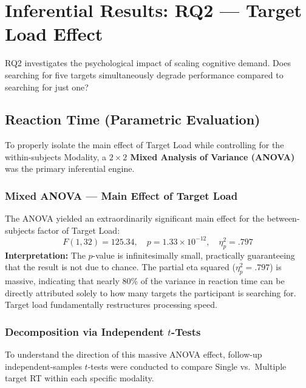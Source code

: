 \documentclass[11pt,a4paper]{article}
\begin{document}
\section{Inferential Results: RQ2 --- Target Load Effect}
\label{sec:rq2}

RQ2 investigates the psychological impact of scaling cognitive demand. Does searching for five targets simultaneously degrade performance compared to searching for just one?

\subsection{Reaction Time (Parametric Evaluation)}

To properly isolate the main effect of Target Load while controlling for the within-subjects Modality, a \textbf{$2 \times 2$ Mixed Analysis of Variance (ANOVA)} was the primary inferential engine.

\subsubsection{Mixed ANOVA --- Main Effect of Target Load}
The ANOVA yielded an extraordinarily significant main effect for the between-subjects factor of Target Load:
\[
F(1, 32) = 125.34, \quad p = 1.33 \times 10^{-12}, \quad \eta_p^2 = .797
\]
\textbf{Interpretation:} The $p$-value is infinitesimally small, practically guaranteeing that the result is not due to chance. The partial eta squared ($\eta_p^2 = .797$) is massive, indicating that nearly 80\% of the variance in reaction time can be directly attributed solely to how many targets the participant is searching for. Target load fundamentally restructures processing speed.

\subsubsection{Decomposition via Independent $t$-Tests}
To understand the direction of this massive ANOVA effect, follow-up independent-samples $t$-tests were conducted to compare Single vs.\ Multiple target RT within each specific modality.

\begin{table}[htbp]
\centering
\caption{Independent-samples $t$-tests: Single vs.\ Multiple Target RT.}
\label{tab:ttest_rq2}
\end{table}
\end{document}
